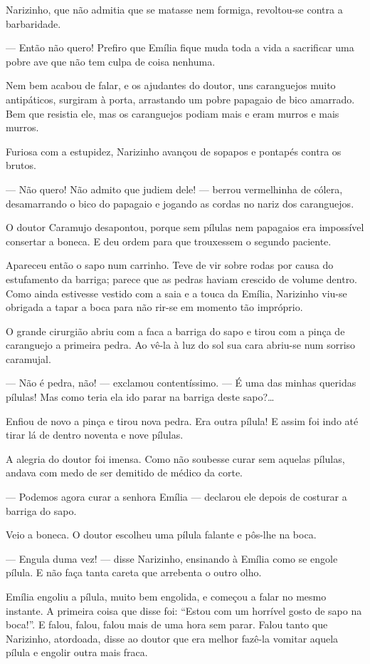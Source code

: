 Narizinho, que não admitia que se matasse nem formiga, revoltou-se
contra a barbaridade.

--- Então não quero! Prefiro que Emília fique muda toda a vida a
sacrificar uma pobre ave que não tem culpa de coisa nenhuma.

Nem bem acabou de falar, e os ajudantes do doutor, uns caranguejos muito
antipáticos, surgiram à porta, arrastando um pobre papagaio de bico
amarrado. Bem que resistia ele, mas os caranguejos podiam mais e eram
murros e mais murros.

Furiosa com a estupidez, Narizinho avançou de sopapos e pontapés contra
os brutos.

--- Não quero! Não admito que judiem dele! --- berrou vermelhinha de
cólera, desamarrando o bico do papagaio e jogando as cordas no nariz dos
caranguejos.

O doutor Caramujo desapontou, porque sem pílulas nem papagaios era
impossível consertar a boneca. E deu ordem para que trouxessem o segundo
paciente.

Apareceu então o sapo num carrinho. Teve de vir sobre rodas por causa do
estufamento da barriga; parece que as pedras haviam crescido de volume
dentro. Como ainda estivesse vestido com a saia e a touca da Emília,
Narizinho viu-se obrigada a tapar a boca para não rir-se em momento tão
impróprio.

O grande cirurgião abriu com a faca a barriga do sapo e tirou com a
pinça de caranguejo a primeira pedra. Ao vê-la à luz do sol sua cara
abriu-se num sorriso caramujal.

--- Não é pedra, não! --- exclamou contentíssimo. --- É uma das minhas
queridas pílulas! Mas como teria ela ido parar na barriga deste
sapo?\ldots{}

Enfiou de novo a pinça e tirou nova pedra. Era outra pílula! E assim foi
indo até tirar lá de dentro noventa e nove pílulas.

A alegria do doutor foi imensa. Como não soubesse curar sem aquelas
pílulas, andava com medo de ser demitido de médico da corte.

--- Podemos agora curar a senhora Emília --- declarou ele depois de
costurar a barriga do sapo.

Veio a boneca. O doutor escolheu uma pílula falante e pôs-lhe na boca.

--- Engula duma vez! --- disse Narizinho, ensinando à Emília como se
engole pílula. E não faça tanta careta que arrebenta o outro olho.

Emília engoliu a pílula, muito bem engolida, e começou a falar no mesmo
instante. A primeira coisa que disse foi: ``Estou com um horrível gosto
de sapo na boca!''. E falou, falou, falou mais de uma hora sem parar.
Falou tanto que Narizinho, atordoada, disse ao doutor que era melhor
fazê-la vomitar aquela pílula e engolir outra mais fraca.

